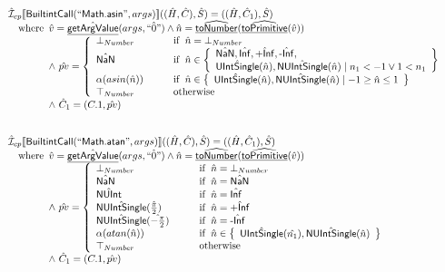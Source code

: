 \documentclass{article}
\newcommand{\SF}[1]{\mbox{\textsf{#1}}}
\newcommand{\wherec}[1]{{\rm where}\begin{array}[t]{l}#1\end{array}}
\newcommand{\ifc}[1]{{\rm if}\begin{array}[t]{l}#1\end{array}}
\newcommand{\owc}{{\rm otherwise}}
\newcommand{\aI}{\hat{\mathcal{I}}}
\newcommand{\set}[1]{\left\{\begin{array}{l}#1\end{array}\right\}}
\newcommand{\lbr}{\llbracket}
\newcommand{\rbr}{\rrbracket}
\newcommand{\hf}[1]{\underline{\sf #1}}
\newcommand{\ahf}[1]{\widehat{\underline{\sf #1}}}
\begin{document}
\[\begin{array}{l}
\aI _{cp}\lbr \SF{BuiltintCall}(``\SF{Math.asin}",args)\rbr((\hat{H},\hat{C}), \hat{S})
  = ((\hat{H}, \hat{C}_1), \hat{S})\\
\quad\wherec{
  \hat{v}=\hat{\hf{getArgValue}}(args,\hat{``0"}) \land \hat{n}=\ahf{toNumber}(\ahf{toPrimitive}(\hat{v}))\\
  \land\ \hat{pv}   = 
  \left\{
    \begin{array}{l@{\quad\quad\quad}l}
      \bot_{Number} & \ifc{\hat{n} = \bot_{Number}}\\
      \hat{\SF{NaN}} & \ifc{\hat{n} \in \set{\hat{\SF{NaN}}, \hat{\SF{Inf}}, \hat{\SF{+Inf}}, \hat{\SF{-Inf}}, \\\hat{\SF{UIntSingle}}(\hat{n}), \hat{\SF{NUIntSingle}}(\hat{n}) \mid n_1<-1 \lor 1<n_1}}\\
      \alpha(asin(\hat{n})) & \ifc{\hat{n} \in \set{\hat{\SF{UIntSingle}}(\hat{n}), \hat{\SF{NUIntSingle}}(\hat{n}) \mid -1\geq \hat{n} \leq 1}}\\
      \top_{Number} & \owc\\
    \end{array}
  \right.\\
  \land\ \hat{C}_1 = (C.1, \hat{pv})
  }\\
\\\\



\aI _{cp}\lbr \SF{BuiltintCall}(``\SF{Math.atan}",args)\rbr((\hat{H},\hat{C}), \hat{S})
  = ((\hat{H}, \hat{C}_1), \hat{S})\\
\quad\wherec{
  \hat{v}=\hat{\hf{getArgValue}}(args,\hat{``0"}) \land \hat{n}=\ahf{toNumber}(\ahf{toPrimitive}(\hat{v}))\\
  \land\ \hat{pv}   = 
  \left\{
    \begin{array}{l@{\quad\quad\quad}l}
      \bot_{Number} & \ifc{\hat{n} = \bot_{Number}}\\
      \hat{\SF{NaN}} & \ifc{\hat{n} = \hat{\SF{NaN}}}\\
      \hat{\SF{NUInt}} & \ifc{\hat{n} = \hat{\SF{Inf}}}\\
      \hat{\SF{NUIntSingle}}(\hat{\frac{\pi}{2}}) & \ifc{\hat{n}=\hat{\SF{+Inf}}}\\
      \hat{\SF{NUIntSingle}}(\hat{-\frac{\pi}{2}}) & \ifc{\hat{n}=\hat{\SF{-Inf}}}\\
      \alpha(atan(\hat{n})) & \ifc{\hat{n} \in \set{\hat{\SF{UIntSingle}}(\hat{n_1}), \hat{\SF{NUIntSingle}}(\hat{n})}}\\
      \top_{Number} & \owc\\
    \end{array}
  \right.\\
  \land\ \hat{C}_1 = (C.1, \hat{pv})
  }\\
\\\\

\end{array}
\]
\end{document}
